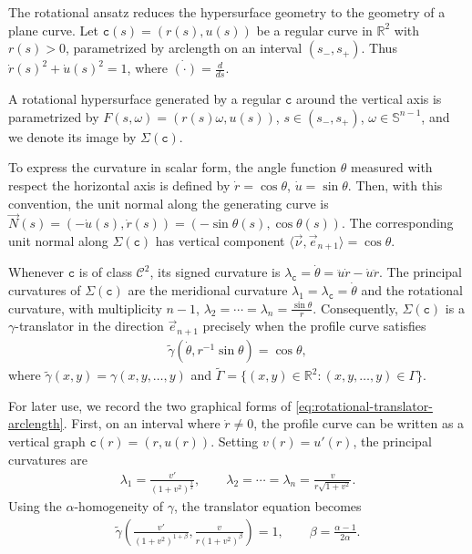 \documentclass{amsart}
\theoremstyle{plain}
\theoremstyle{mainintrothm}
\theoremstyle{definition}
\begin{document}
The rotational ansatz reduces the hypersurface geometry to the geometry of a
plane curve.  Let $\mathtt c(s)=(r(s),u(s))$ be a regular curve in
$\mathbb R^2$ with $r(s)>0$, parametrized by arclength on an interval
$(s_-,s_+)$.  Thus $\dot r(s)^2+\dot u(s)^2=1$, where $\dot{(\cdot)}=\frac{d}{ds}$. 

\medskip

 A rotational hypersurface generated by a regular
$\mathtt c$ around the vertical axis is parametrized by $F(s,\omega)=(r(s)\omega,u(s))$, $s\in(s_-,s_+)$, $\omega\in\mathbb S^{n-1}$, and we denote its image by $\Sigma(\mathtt c)$.

\medskip

To express the curvature in scalar form, the angle function $\theta$  measured with respect the horizontal axis is defined
by $\dot r=\cos\theta$, $\dot u=\sin\theta$. Then, with this convention, the unit normal along the generating curve is $\vec N(s)=(-\dot u(s),\dot r(s))=(-\sin\theta(s),\cos\theta(s))$. The corresponding unit normal along $\Sigma(\mathtt c)$ has vertical component $\langle\vec\nu,\vec e_{n+1}\rangle=\cos\theta$.

\medskip

Whenever $\mathtt c$ is of class $\mathcal C^2$, its signed curvature is
$\lambda_{\mathtt c}=\dot\theta=\ddot u\dot r-\dot u\ddot r$. The principal curvatures of $\Sigma(\mathtt c)$ are the meridional curvature $\lambda_1=\lambda_{\mathtt c}=\dot\theta$ and the rotational curvature, with multiplicity $n-1$, $\lambda_2=\cdots=\lambda_n=\frac{\sin\theta}{r}$. Consequently, $\Sigma(\mathtt c)$ is a $\gamma$-translator in the direction
$\vec e_{n+1}$ precisely when the profile curve satisfies
\begin{align}
	\label{eq:rotational-translator-arclength}
	\widetilde\gamma
	\left(
	\dot\theta, r^{-1}\sin\theta
   \right)
	=
	\cos\theta,
\end{align}
where $\widetilde\gamma(x,y)=\gamma(x,y,\ldots,y)$ and  $\widetilde\Gamma=\{(x,y)\in\mathbb R^2:(x,y,\ldots,y)\in\Gamma\}$.

\medskip

For later use, we record the two graphical forms of
\eqref{eq:rotational-translator-arclength}.  First, on an interval where
$\dot r\ne0$, the profile curve can be written as a vertical graph
$\mathtt c(r)=(r,u(r))$.  Setting $v(r)=u'(r)$, the principal curvatures are
\begin{align*}
	\lambda_1
	=
	\frac{v'}{(1+v^2)^{\frac{3}{2}}},
	\qquad
	\lambda_2=\cdots=\lambda_n
	=
	\frac{v}{r\sqrt{1+v^2}}.
\end{align*}
Using the $\alpha$-homogeneity of $\gamma$, the translator equation becomes
\begin{align}
	\label{eq:vertical-graph-translator}
	\widetilde\gamma
	\left(
	\frac{v'}{(1+v^2)^{1+\beta}},
	\frac{v}{r(1+v^2)^\beta}
	\right)
	=
	1,
	\qquad
	\beta=\frac{\alpha-1}{2\alpha}.
\end{align}
\end{document}
